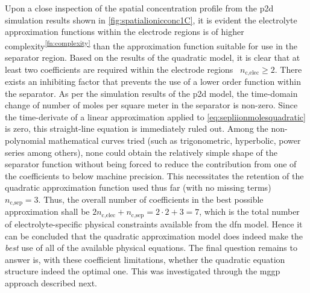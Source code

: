 Upon a close inspection of the  spatial concentration profile from the \gls{p2d}
simulation  results shown  in \cref{fig:spatialionicconc1C}, it  is evident  the
electrolyte approximation  functions within the  electrode regions is  of higher
complexity\textsuperscript{\ref{fn:complexity}} than  the approximation function
suitable  for  use  in  the  separator  region. Based  on  the  results  of  the
quadratic  model, it  is  clear  that at  least  two  coefficients are  required
within the  electrode regions \ie~$n_{\text{c,elec}} \ge 2$. There  exists an
inhibiting  factor that  prevents  the  use of  a  lower  order function  within
the  separator. As  per  the  simulation results  of  the  \gls{p2d} model,  the
time-domain  change  of number  of  moles  per  square  meter in  the  separator
is  non-zero.  Since  the  time-derivate   of  a  linear  approximation  applied
to \cref{eq:sepliionmolesquadratic}  is  zero,  this straight-line  equation  is
immediately ruled out. Among the  non-polynomial mathematical curves tried (such
as trigonometric, hyperbolic, power series  among others), none could obtain the
relatively simple shape of the separator function without being forced to reduce
the  contribution from  one  of  the coefficients  to  below machine  precision.
This necessitates  the retention  of the  quadratic approximation  function used
thus  far  (with  no  missing  terms) \ie~$n_\text{c,sep}  =  3$.  Thus,  the
overall number  of coefficients in the  best possible approximation shall  be $2
n_\text{c,elec} + n_\text{c,sep} =  2\cdot2 + 3 = 7$, which  is the total number
of electrolyte-specific physical constraints available from the \gls{dfn} model.
Hence it  can be concluded  that the  quadratic approximation model  does indeed
make the \emph{best}  use of all of the available  physical equations. The final
question remains to  answer is, with these coefficient  limitations, whether the
quadratic  equation structure  indeed  the optimal  one.  This was  investigated
through the \gls{mggp} approach described next.

